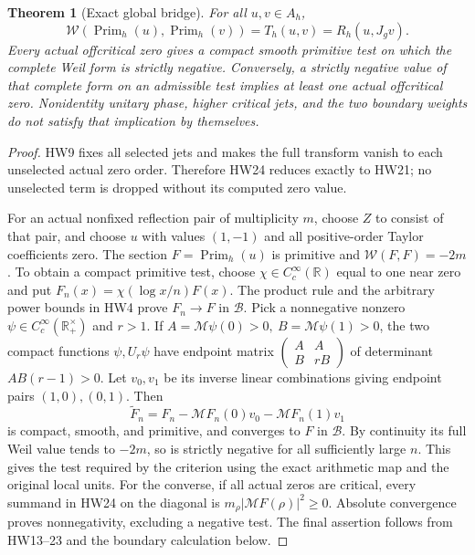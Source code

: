 \documentclass[11pt]{article}
\newtheorem{theorem}{Theorem}
\newcommand{\R}{\mathbb R}
\newcommand{\B}{\mathscr B}
\newcommand{\M}{\mathcal M}
\begin{document}
\begin{theorem}[Exact global bridge]\label{hw:globalbridge}
For all \(u,v\in A_h\),
\[
 \mathcal W(\operatorname{Prim}_h(u),
             \operatorname{Prim}_h(v))
        =T_h(u,v)=R_h(u,J_gv).
 \tag{HW30}\label{hw:bridge}
\]
Every actual offcritical zero gives a compact smooth primitive
test on which the complete Weil form is strictly negative.
Conversely, a strictly negative value of that complete form on
an admissible test implies at least one actual offcritical zero.
Nonidentity unitary phase, higher critical jets, and the two
boundary weights do not satisfy that implication by themselves.
\end{theorem}
\begin{proof}
HW9 fixes all selected jets and makes the full transform vanish
to each unselected actual zero order. Therefore HW24 reduces
exactly to HW21; no unselected term is dropped without its
computed zero value.

For an actual nonfixed reflection pair of multiplicity \(m\),
choose \(Z\) to consist of that pair, and choose \(u\) with
values \((1,-1)\) and all positive-order Taylor coefficients
zero. The section \(F=\operatorname{Prim}_h(u)\) is primitive
and \(\mathcal W(F,F)=-2m\).
To obtain a compact primitive test, choose
\(\chi\in C_c^\infty(\R)\) equal to one near zero and put
\(F_n(x)=\chi(\log x/n)F(x)\).
The product rule and the arbitrary power bounds in HW4
prove \(F_n\to F\) in \(\B\).
Pick a nonnegative nonzero \(\psi\in C_c^\infty(\R_+^\times)\)
and \(r>1\). If \(A=\M\psi(0)>0,\ B=\M\psi(1)>0\),
the two compact functions \(\psi,U_r\psi\) have endpoint
matrix \(\left(\begin{smallmatrix}A&A\\ B&rB\end{smallmatrix}\right)\)
of determinant \(AB(r-1)>0\).
Let \(v_0,v_1\) be its inverse linear combinations giving
endpoint pairs \((1,0),(0,1)\).
Then
\[
 \widetilde F_n=F_n-\M F_n(0)v_0-\M F_n(1)v_1
 \tag{HW31}
\]
is compact, smooth, and primitive, and converges to \(F\)
in \(\B\). By continuity its full Weil value tends to
\(-2m\), so is strictly negative for all sufficiently large
\(n\). This gives the test required by the criterion using
the exact arithmetic map and the original local units.
For the converse, if all actual zeros are critical, every
summand in HW24 on the diagonal is
\(m_\rho|\M F(\rho)|^2\ge0\).
Absolute convergence proves nonnegativity, excluding a
negative test. The final assertion follows from HW13--23
and the boundary calculation below.
\end{proof}
\end{document}
